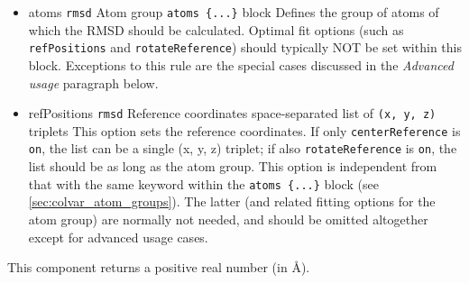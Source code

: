 \begin{itemize}

\item %
  \key
    {atoms}{%
    \texttt{rmsd}}{%
    Atom group}{%
    \texttt{atoms~\{...\}} block}{%
    Defines the group of atoms of which the RMSD should be calculated.
    Optimal fit options (such as \texttt{refPositions} and
    \texttt{rotateReference}) should typically NOT be set within this
    block. Exceptions to this rule are the special cases discussed in
    the \emph{Advanced usage} paragraph below.
    }

\item %
  \key
    {refPositions}{%
    \texttt{rmsd}}{%
    Reference coordinates}{%
    space-separated list of \texttt{(x, y, z)} triplets}{%
    This option
    sets the reference coordinates.  If only \texttt{centerReference} is \texttt{on}, the list can be a single (x, y, z) triplet; if also \texttt{rotateReference} is \texttt{on}, the list should be as long as the atom group.  This option 
    is independent from that with the same keyword within the
    \texttt{atoms~\{...\}} block (see \ref{sec:colvar_atom_groups}).  The latter (and related fitting
    options for the atom group) are normally not needed,
    and should be omitted altogether except for advanced usage cases.
    }


\end{itemize}
This component returns a positive real number (in \AA).

